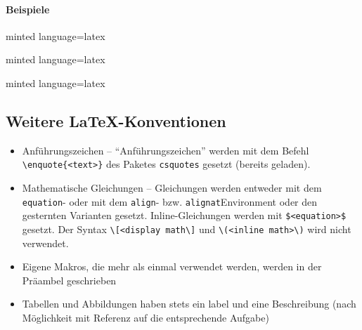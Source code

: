 \documentclass[
    titleprefix=AlgoTeX,
    inlineshortcut=java,
    corporatedesign,
    boxarc,
]{algoexercise}
\begin{document}
    \paragraph{Beispiele}\mbox{}

    \begin{minipage}{0.3\textwidth}
    \end{minipage}%
    \begin{minipage}{.7\textwidth}
        \begin{codeBlock}[]{minted language=latex}
        \end{codeBlock}
    \end{minipage}

    \begin{minipage}{0.3\textwidth}
    \end{minipage}%
    \begin{minipage}{.7\textwidth}
        \begin{codeBlock}[]{minted language=latex}
        \end{codeBlock}
    \end{minipage}

    \begin{minipage}{0.3\textwidth}
    \end{minipage}%
    \begin{minipage}{.7\textwidth}
        \begin{codeBlock}[]{minted language=latex}
        \end{codeBlock}
    \end{minipage}%
    \clearpage
    \subsection{Weitere \LaTeX-Konventionen}
    \begin{itemize}
        \item Anführungszeichen -- \enquote{Anführungszeichen} werden mit dem Befehl \verb+\enquote{<text>}+ des Paketes
            \verb+csquotes+
            gesetzt (bereits geladen).
        \item Mathematische Gleichungen -- Gleichungen werden entweder mit dem \verb+equation+- oder mit dem \verb+align+- bzw.
            \verb+alignat+Environment oder den gesternten Varianten gesetzt.
            Inline-Gleichungen werden mit \verb+$<equation>$+ gesetzt.
            Der Syntax \verb+\[<display math\]+ und \verb+\(<inline math>\)+ wird nicht verwendet.
        \item Eigene Makros, die mehr als einmal verwendet werden, werden in der Präambel geschrieben
        \item Tabellen und Abbildungen haben stets ein label und eine Beschreibung (nach Möglichkeit mit Referenz auf die
            entsprechende Aufgabe)
    \end{itemize}
    \clearpage{}
\end{document}
